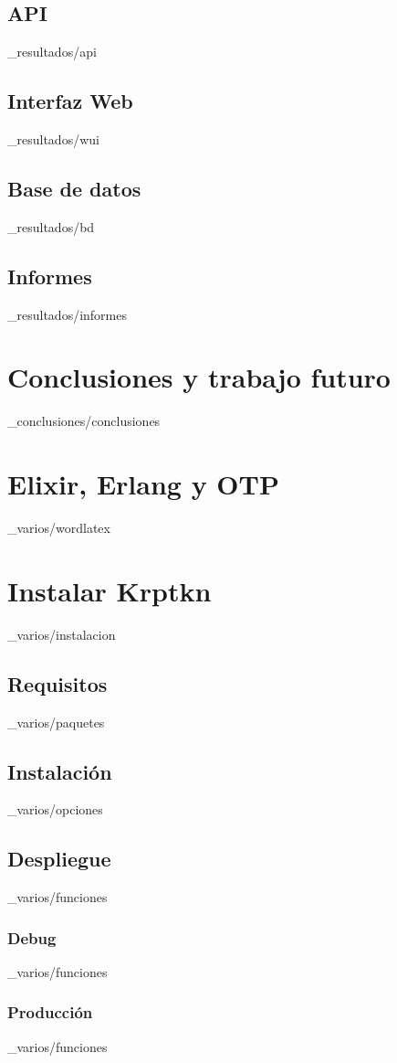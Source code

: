 \documentclass[epsbased,copyright,final,printable,covers,extendedindex,firstnumbered,tfg,gnuplot]{tfgtfmthesisuam}
\begin{document}
  \section{API\label{SEC:API}}{_resultados/api}
  \section{Interfaz Web\label{SEC:WUI}}{_resultados/wui}
  \section{Base de datos\label{SEC:BD}}{_resultados/bd}
  \section{Informes\label{SEC:INFORMES}}{_resultados/informes}

\chapter{Conclusiones y trabajo futuro\label{CAP:CONCLUSIONES}}{_conclusiones/conclusiones}

\appendix

\chapter{Elixir, Erlang y OTP\label{CAP:INSTALACION}}{_varios/wordlatex}
\chapter{Instalar Krptkn\label{CAP:INSTALACION}}{_varios/instalacion}
  \section{Requisitos\label{SEC:NUCLEO}}{_varios/paquetes}
  \section{Instalación\label{SEC:API}}{_varios/opciones}
  \section{Despliegue\label{SEC:API}}{_varios/funciones}
    \subsection{Debug\label{SS:LIBEXTRACTOR}}{_varios/funciones}
    \subsection{Producción\label{SS:FILTROS}}{_varios/funciones}


\end{document}
